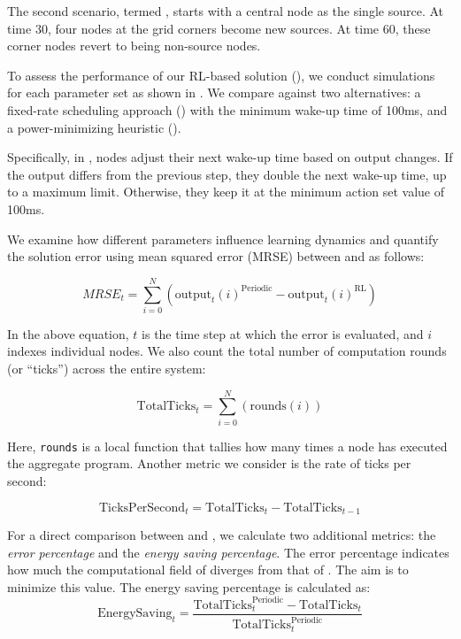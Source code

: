 The second scenario, termed \multiswap{}, 
 starts with a central node as the single source. 
 At time 30, four nodes at the grid corners become new sources. 
 At time 60, these corner nodes revert to being non-source nodes.
 
To assess the performance of our RL-based solution (\rlsol{}), 
 we conduct simulations for each parameter set as shown in . 
 We compare \rlsol{} against two alternatives: a fixed-rate scheduling approach (\periodicsol{}) with the minimum wake-up time of 100ms, and a power-minimizing heuristic (\adhocsol{}).
 
Specifically, in \adhocsol{}, nodes adjust their next wake-up time based on output changes. 
 If the output differs from the previous step, 
 they double the next wake-up time, up to a maximum limit. Otherwise, they keep it at the minimum action set value of 100ms.
 
We examine how different parameters influence learning dynamics and quantify the solution error using mean squared error (MRSE) between \periodicsol{} and \rlsol{} as follows:
 
 \begin{equation}
     MRSE_t = \sum_{i=0}^{N} (\text{output}_t(i)^{\text{Periodic}} - \text{output}_t(i)^{\text{RL}})
 \end{equation}
 
 In the above equation, $t$ is the time step at which the error is evaluated, and $i$ indexes individual nodes. 
  We also count the total number of computation rounds (or ``ticks'') across the entire system:
 
 \begin{equation}
     \text{TotalTicks}_t = \sum_{i=0}^{N} (\text{rounds}(i))
 \end{equation}
 
 Here, \texttt{rounds} is a local function that tallies how many times a node has executed the aggregate program. 
  Another metric we consider is the rate of ticks per second:
 
 \begin{equation}
     \text{TicksPerSecond}_t = \text{TotalTicks}_t - \text{TotalTicks}_{t-1}
 \end{equation}
 
For a direct comparison between \rlsol{} and \adhocsol{}, 
 we calculate two additional metrics: 
 the \emph{error percentage} and the \emph{energy saving percentage}. 
% 
The error percentage indicates how much the computational field of \rlsol{} diverges from that of \periodicsol{}. 
 The aim is to minimize this value. 
 The energy saving percentage is calculated as:
 \begin{equation}
     \text{EnergySaving}_t = \frac{\text{TotalTicks}^{\text{Periodic}}_t - \text{TotalTicks}_t}{\text{TotalTicks}^{\text{Periodic}}_t}
 \end{equation}
 
